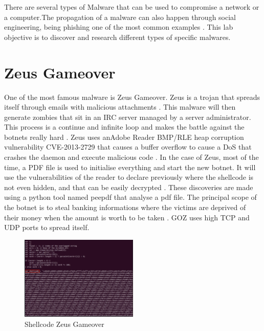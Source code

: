 There are several types of Malware that can be used to compromise a network or
a computer.The propagation of a malware can also happen through social
engineering, being phishing one of the most common examples \citep{greenbergSandwormNewEra2019}.
This lab objective is to discover and research different types of specific
malwares.

\section{Zeus Gameover}
\label{s:Zeus-Gameover}
One of the most famous malware is Zeus Gameover. Zeus is a trojan that spreads
itself through emails with malicious attachments \citep{wikipediaGameoverZeuS2021}.
This malware will then generate zombies that sit in an IRC server managed by a
server administrator. This process is a continue and infinite loop and makes the
battle against the botnets really hard \citep{firatInevitableBattleBotnets2020}.
Zeus uses anAdobe Reader BMP/RLE heap corruption vulnerability CVE-2013-2729 that
causes a buffer overflow to cause a DoS that crashes the daemon and execute
malicious code \citep{ismailEffectsFeatureSelection2021}.
In the case of Zeus, most of the time, a PDF file is used to initialise
everything and start the new botnet. It will use the vulnerabilities of the
reader to declare previously where the shellcode is not even hidden, and that
can be easily decrypted \citep{eternalSpammedCVE20132729PDF2013}. These
discoveries are made using a python tool named peepdf that analyse a pdf file.
The principal scope of the botnet is to steal banking informations where the
victims are deprived of their money when the amount is worth to be taken \citep{
knowbe4GameoverZeusGOZ2020}. GOZ uses high TCP and UDP ports to spread itself.

\begin{figure}[H]
  \centering
  \includegraphics[width=0.5\textwidth]{figures/shellcode-zeus}
  \caption{Shellcode Zeus Gameover}
  \label{f:shellcode-zeus}
\end{figure}

